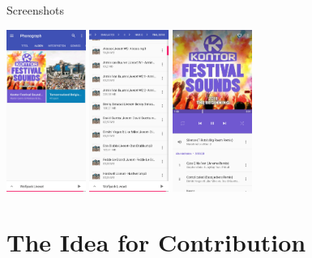 \documentclass[final, english, xcolor=pdftex, dvipsnames, handout, table, aspectratio=169, 14pt]{beamer}
\begin{document}
\begin{frame}{Screenshots}

\centering
\includegraphics[height=200px]{pictures/Library.jpg} \includegraphics[height=200px]{pictures/Folders.jpg} \includegraphics[height=200px]{pictures/Player.jpg}

\end{frame}

\section{The Idea for Contribution}
\end{document}

